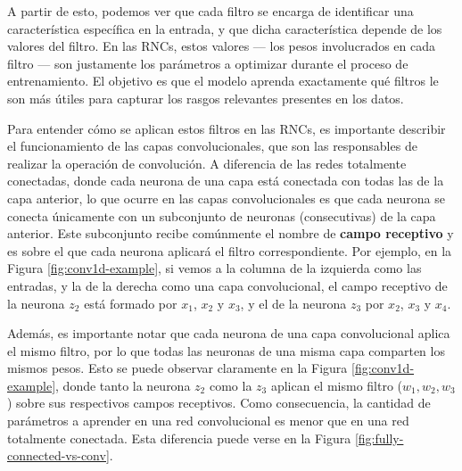 \documentclass[../../main.tex]{subfiles}
\begin{document}
A partir de esto, podemos ver que cada filtro se encarga de identificar una característica
específica en la entrada, y que dicha característica depende de los valores del filtro. En
las RNCs, estos valores — los pesos involucrados en cada filtro — son justamente los
parámetros a optimizar durante el proceso de entrenamiento. El objetivo es que el modelo
aprenda exactamente qué filtros le son más útiles para capturar los rasgos relevantes
presentes en los datos.

Para entender cómo se aplican estos filtros en las RNCs, es importante describir el
funcionamiento de las capas convolucionales, que son las responsables de realizar la
operación de convolución. A diferencia de las redes totalmente conectadas, donde cada
neurona de una capa está conectada con todas las de la capa anterior, lo que ocurre en las
capas convolucionales es que cada neurona se conecta únicamente con un subconjunto de
neuronas (consecutivas) de la capa anterior. Este subconjunto recibe comúnmente el nombre
de \textbf{campo receptivo} y es sobre el que cada neurona aplicará el filtro
correspondiente. Por ejemplo, en la Figura \ref{fig:conv1d-example}, si vemos a la columna
de la izquierda como las entradas, y la de la derecha como una capa convolucional, el
campo receptivo de la neurona \(z_2\) está formado por \(x_1\), \(x_2\) y \(x_3\), y el de
la neurona \(z_3\) por \(x_2\), \(x_3\) y \(x_4\).

Además, es importante notar que cada neurona de una capa convolucional aplica el mismo
filtro, por lo que todas las neuronas de una misma capa comparten los mismos pesos. Esto
se puede observar claramente en la Figura \ref{fig:conv1d-example}, donde tanto la neurona
\(z_2\) como la \(z_3\) aplican el mismo filtro (\(w_1, w_2, w_3\)) sobre sus respectivos
campos receptivos. Como consecuencia, la cantidad de parámetros a aprender en una red
convolucional es menor que en una red totalmente conectada. Esta diferencia puede verse en
la Figura \ref{fig:fully-connected-vs-conv}.
\end{document}
